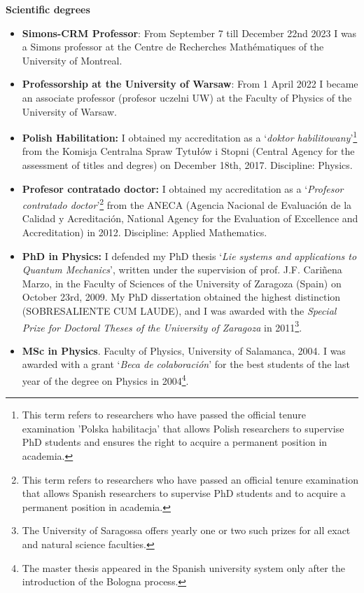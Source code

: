 \documentclass[12pt,reqno]{amsbook}
\begin{document}
{\Large \textbf{Scientific degrees}}
\vspace{1cm}
\begin{itemize}
	
        \item[1.] {\bf Simons-CRM Professor}: From September 7 till December 22nd 2023 I was a Simons professor at the Centre de Recherches Math\'ematiques of the University of Montreal.
        \item[2.] {\bf Professorship at the University of Warsaw}: From 1 April 2022 I became an associate professor (profesor uczelni UW) at the Faculty of Physics of the University of Warsaw.
        \item[3.] \textbf {Polish Habilitation:} I obtained my accreditation as a `{\it doktor habilitowany}'\footnote{This term refers to researchers who have passed the  official tenure examination 'Polska habilitacja' that allows Polish researchers to supervise PhD students and ensures the right to acquire a permanent position in academia.} from the Komisja Centralna Spraw Tytu\l \'ow i Stopni (Central Agency for the assessment of titles and degres) on December 18th, 2017. Discipline: Physics.
        \item[4.] \textbf {Profesor contratado doctor:} I obtained my accreditation as a `{\it Profesor contratado doctor}'\footnote{This term refers to researchers who have passed an official tenure examination that allows Spanish researchers to supervise PhD students and to acquire a permanent position in academia.} from the ANECA (Agencia Nacional de Evaluaci\'on de la Calidad y Acreditaci\'on, National Agency for the Evaluation of Excellence and Accreditation) in 2012.  Discipline: Applied Mathematics.
        \item[5.] \textbf {PhD in Physics:} I defended my PhD thesis `{\it Lie systems and applications to Quantum Mechanics}', written under the supervision of prof. J.F. Cari\~nena Marzo, in the Faculty of Sciences of the University of Zaragoza (Spain) on October 23rd, 2009. My PhD dissertation obtained the highest distinction (SOBRESALIENTE CUM LAUDE), and I was awarded with the {\it Special Prize for Doctoral Theses of the University of Zaragoza} in 2011\footnote{The University of Saragossa offers yearly one or two such prizes for all exact and natural science faculties.}.
        \item [6.] \textbf{MSc in Physics}. Faculty of Physics, University of Salamanca, 2004. I was awarded with a grant `{\it Beca de colaboraci\'on}' for the best students of the last year of the degree on Physics in 2004\footnote{The master thesis appeared in the Spanish university system only after the introduction of the Bologna process.}.
\end{itemize}
\vspace{1cm}
\end{document}
